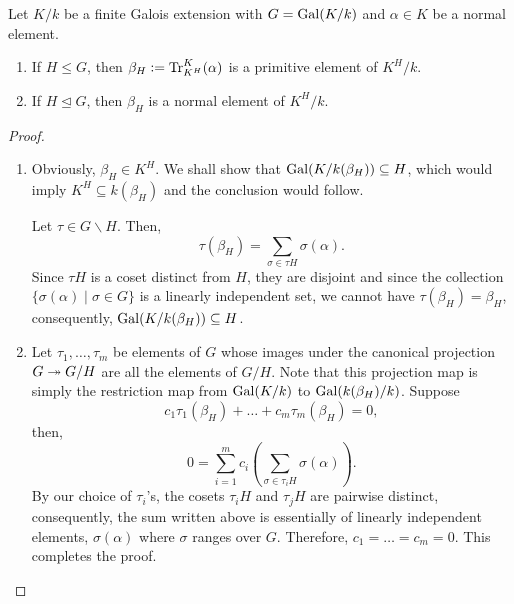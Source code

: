 \begin{theorem}
    Let $K/k$ be a finite Galois extension with $G = \operatorname{Gal}(K/k)$ and $\alpha\in K$ be a normal element.
    \begin{enumerate}[label=(\alph*)]
        \item If $H\le G$, then $\beta_H := \operatorname{Tr}^K_{K^H}(\alpha)$ is a primitive element of $K^H/k$. 
        \item If $H\unlhd G$, then $\beta_H$ is a normal element of $K^H/k$.
    \end{enumerate}
\end{theorem}
\begin{proof}
\begin{enumerate}[label=(\alph*)]
    \item Obviously, $\beta_H\in K^H$. We shall show that $\operatorname{Gal}(K/k(\beta_H))\subseteq H$, which would imply $K^H\subseteq k(\beta_H)$ and the conclusion would follow.

    Let $\tau\in G\backslash H$. Then, 
    \begin{equation*}
        \tau(\beta_H) = \sum_{\sigma\in \tau H}\sigma(\alpha).
    \end{equation*}
    Since $\tau H$ is a coset distinct from $H$, they are disjoint and since the collection $\{\sigma(\alpha)\mid\sigma\in G\}$ is a linearly independent set, we cannot have $\tau(\beta_H) = \beta_H$, consequently, $\operatorname{Gal}(K/k(\beta_H))\subseteq H$.

    \item Let $\tau_1,\dots,\tau_m$ be elements of $G$ whose images under the canonical projection $G\twoheadrightarrow G/H$ are all the elements of $G/H$. Note that this projection map is simply the restriction map from $\operatorname{Gal}(K/k)$ to $\operatorname{Gal}(k(\beta_H)/k)$. Suppose 
    \begin{equation*}
        c_1\tau_1(\beta_H) + \dots + c_m\tau_m(\beta_H) = 0,
    \end{equation*}
    then, 
    \begin{equation*}
        0 = \sum_{i = 1}^mc_i\left(\sum_{\sigma\in \tau_i H}\sigma(\alpha)\right).
    \end{equation*}
    By our choice of $\tau_i$'s, the cosets $\tau_i H$ and $\tau_j H$ are pairwise distinct, consequently, the sum written above is essentially of linearly independent elements, $\sigma(\alpha)$ where $\sigma$ ranges over $G$. Therefore, $c_1 = \dots = c_m = 0$. This completes the proof.\qedhere
\end{enumerate}
\end{proof}

